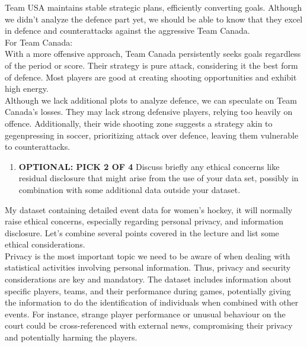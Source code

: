 \documentclass[
  a3paper,
]{article}
\providecommand{\tightlist}{%
  \setlength{\itemsep}{0pt}\setlength{\parskip}{0pt}}
\begin{document}
Team USA maintains stable strategic plans, efficiently converting goals.
Although we didn't analyze the defence part yet, we should be able to
know that they excel in defence and counterattacks against the
aggressive Team Canada.\\

For Team Canada:\\
With a more offensive approach, Team Canada persistently seeks goals
regardless of the period or score. Their strategy is pure attack,
considering it the best form of defence. Most players are good at
creating shooting opportunities and exhibit high energy.\\

Although we lack additional plots to analyze defence, we can speculate
on Team Canada's losses. They may lack strong defensive players, relying
too heavily on offence. Additionally, their wide shooting zone suggests
a strategy akin to gegenpressing in soccer, prioritizing attack over
defence, leaving them vulnerable to counterattacks.\\

\newpage

\vspace{2cm}

\begin{enumerate}
\def\labelenumi{\arabic{enumi})}
\setcounter{enumi}{7}
\tightlist
\item
  \textbf{OPTIONAL: PICK 2 OF 4} Discuss briefly any ethical concerns
  like residual disclosure that might arise from the use of your data
  set, possibly in combination with some additional data outside your
  dataset.
\end{enumerate}

My dataset containing detailed event data for women's hockey, it will
normally raise ethical concerns, especially regarding personal privacy,
and information disclosure. Let's combine several points covered in the
lecture and list some ethical considerations.\\

Privacy is the most important topic we need to be aware of when dealing
with statistical activities involving personal information. Thus,
privacy and security considerations are key and mandatory. The dataset
includes information about specific players, teams, and their
performance during games, potentially giving the information to do the
identification of individuals when combined with other events. For
instance, strange player performance or unusual behaviour on the court
could be cross-referenced with external news, compromising their privacy
and potentially harming the players.\\
\end{document}
